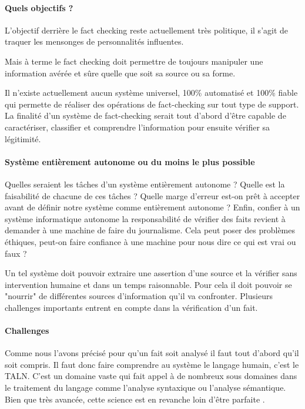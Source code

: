 \paragraph{Quels objectifs ?}

L'objectif derrière le fact checking reste actuellement très politique, il s'agit de traquer les mensonges de personnalités influentes.

Mais à terme le fact checking doit permettre de toujours manipuler une information avérée et sûre quelle que soit sa source ou sa forme.

Il n'existe actuellement aucun système universel, 100\% automatisé et 100\% fiable qui permette de réaliser des opérations de fact-checking sur tout type de support. La finalité d'un système de fact-checking serait tout d'abord d'être capable de caractériser, classifier et comprendre l'information pour ensuite vérifier sa légitimité. 

\paragraph{Système entièrement autonome ou du moins le plus possible}

Quelles seraient les tâches d'un système entièrement autonome ? Quelle est la faisabilité de chacune de ces tâches ? Quelle marge d'erreur est-on prêt à accepter avant de définir notre système comme entièrement autonome ? Enfin, confier à un système informatique autonome la responsabilité de vérifier des faits revient à demander à une machine de faire du journalisme. Cela peut poser des problèmes éthiques, peut-on faire confiance à une machine pour nous dire ce qui est vrai ou faux ?

Un tel système doit pouvoir extraire une assertion d'une source et la vérifier sans intervention humaine et dans un temps raisonnable. Pour cela il doit pouvoir se "nourrir" de différentes sources d'information qu'il va confronter. Plusieurs challenges importants entrent en compte dans la vérification d'un fait.

\paragraph{Challenges}

Comme nous l'avons précisé pour qu'un fait soit analysé il faut tout d'abord qu'il soit compris. Il faut donc faire comprendre au système le langage humain, c'est le TALN. C'est un domaine vaste qui fait appel à de nombreux sous domaines dans le traitement du langage comme l'analyse syntaxique ou l'analyse sémantique. Bien que très avancée, cette science est en revanche loin d'être parfaite \cite{nlp_not_perfect}.

